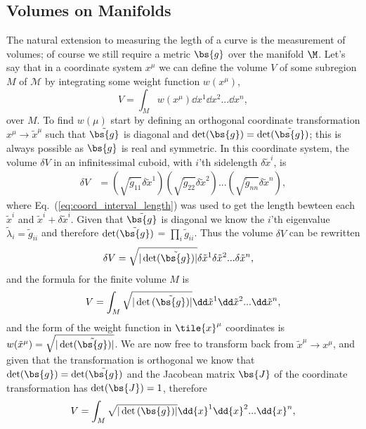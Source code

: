 \subsection{Volumes on Manifolds}
The natural extension to measuring the legth of a curve is the measurement of volumes; of course we still require a metric $\bs{g}$ over the manifold $\M$. Let's say that in a coordinate system $x^\mu$ we can define the volume $V$ of some subregion $M$ of $\mathcal{M}$ by integrating some weight function $w(x^\mu)$,
\begin{equation}
V = \int_{M} w(x^\mu) \dd x^1 \dd x^2 ... \dd x^n,
\end{equation}
over $M$. To find $w(\mu)$ start by defining an orthogonal coordinate transformation $x^\mu \rightarrow \tilde{x}^\mu$ such that $\tilde{\bs{g}}$ is diagonal and $\det(\bs{g})=\det(\tilde{\bs{g}})$; this is always possible as $\bs{g}$ is real and symmetric. In this coordinate system, the volume $\delta V$ in an infinitessimal cuboid, with $i$'th sidelength $\delta \tilde{x}^i$, is
\begin{align}
\delta V &=  \left( \sqrt{\tilde{g}_{11}}\delta \tilde{x}^1 \right)\left(\sqrt{\tilde{g}_{22}}\delta \tilde{x}^2 \right)... \left(\sqrt{\tilde{g}_{nn}}\delta \tilde{x}^n\right) , 
\end{align}
where Eq.~(\ref{eq:coord_interval_length}) was used to get the length bewteen each $\tilde{x}^i$ and $\tilde{x}^i + \delta \tilde{x}^i$. Given that $\tilde{\bs{g}}$ is diagonal we know the $i$'th eigenvalue $\tilde{\lambda}_i = \tilde{g}_{ii}$ and therefore $\det(\tilde{\bs{g}})$ = $\prod_i \tilde{g}_{ii}$. Thus the volume $\delta V$ can be rewritten
\begin{align}
\delta V &=  \sqrt{|\det(\tilde{\bs{g}})|}\delta \tilde{x}^1 \delta \tilde{x}^2  ... \delta \tilde{x}^n , 
\end{align} 
and the formula for the finite volume $M$ is
\begin{equation}
V = \int_{M} \sqrt{|\det{(\tilde{\bs{g}})}|} \dd \tilde{x}^1 \dd \tilde{x}^2 ... \dd \tilde{x}^n,
\end{equation}
and the form of the weight function in $\tile{x}^\mu$ coordinates is $w(\tilde{x}^\mu)= \sqrt{|\det(\tilde{\bs{g}})|}$.
We are now free to transform back from $\tilde{x}^\mu\rightarrow x^\mu$, and given that the transformation is orthogonal we know that $\det(\bs{g})=\det(\tilde{\bs{g}})$ and the Jacobean matrix $\bs{J}$ of the coordinate transformation has $\det({\bs{J}})=1$, therefore
\begin{equation}
V = \int_{M} \sqrt{|\det{({\bs{g}})}|} \dd {x}^1 \dd {x}^2 ... \dd {x}^n,
\end{equation}
